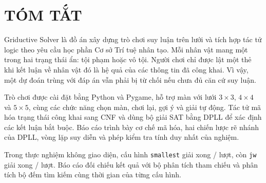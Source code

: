 \chapter*{\MakeUppercase{Tóm tắt}}

Griductive Solver là đồ án xây dựng trò chơi suy luận trên lưới và tích hợp tác tử logic theo yêu cầu học phần Cơ sở Trí tuệ nhân tạo. Mỗi nhân vật mang một trong hai trạng thái ẩn: tội phạm hoặc vô tội. Người chơi chỉ được lật một thẻ khi kết luận về nhân vật đó là hệ quả của các thông tin đã công khai. Vì vậy, một dự đoán trùng với đáp án vẫn phải bị từ chối nếu chưa đủ căn cứ suy luận.

Trò chơi được cài đặt bằng Python và Pygame, hỗ trợ \ExpStageCount{} màn với lưới $3\times3$, $4\times4$ và $5\times5$, cùng các chức năng chọn màn, chơi lại, gợi ý và giải tự động. Tác tử mã hóa trạng thái công khai sang CNF và dùng bộ giải SAT bằng DPLL để xác định các kết luận bắt buộc. Báo cáo trình bày cơ chế mã hóa, hai chiến lược rẽ nhánh của DPLL, vòng lặp suy diễn và phép kiểm tra tính duy nhất của nghiệm.

Trong thực nghiệm không giao diện, cấu hình \texttt{smallest} giải xong \ExpSolvedSmallest{}/\ExpTotalSmallest{} lượt, còn \texttt{jw} giải xong \ExpSolvedJW{}/\ExpTotalJW{} lượt. Báo cáo đối chiếu kết quả với bộ phân tích tham chiếu và phân tích bộ đếm tìm kiếm cùng thời gian của từng cấu hình.
